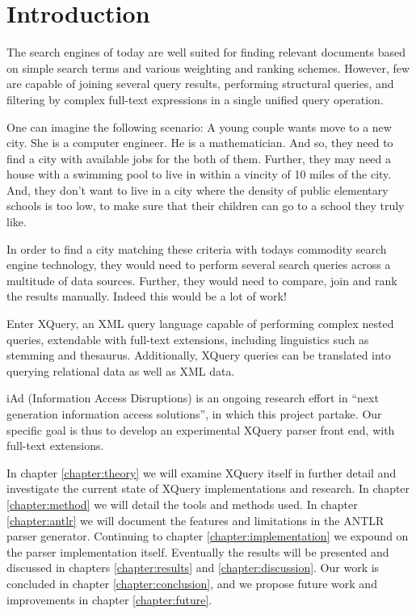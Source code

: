 \chapter{Introduction}
The search engines of today are well suited for finding relevant documents based
on simple search terms and various weighting and ranking schemes. However, few 
are capable of joining several query results, performing structural queries, and
filtering by complex full-text expressions in a single unified query operation.

One can imagine the following scenario: A young couple wants move to a new city.
She is a computer engineer. He is a mathematician. And so, they need to find
a city with available jobs for the both of them. Further, they may need a house
with a swimming pool to live in within a vincity of 10 miles of the city. And,
they don't want to live in a city where the density of public elementary schools
is too low, to make sure that their children can go to a school they truly like.

In order to find a city matching these criteria with todays commodity search
engine technology, they would need to perform several search queries across a
multitude of data sources. Further, they would need to compare, join and
rank the results manually. Indeed this would be a lot of work!

Enter XQuery, an XML query language capable of performing complex nested
queries, extendable with full-text extensions, including linguistics such as
stemming and thesaurus. Additionally, XQuery queries can be translated into
querying relational
data\cite{pathfinder_comptech}\cite{pathfinder_staircase}\cite{galatex}\cite{datadirect} 
as well as XML data.

iAd \cite{iadcentre} (Information Access Disruptions) is an ongoing research
effort in ``next generation information access solutions'', in which this
project partake. Our specific goal is thus to develop an experimental XQuery
parser front end, with full-text extensions.

In chapter \ref{chapter:theory} we will examine XQuery itself in further detail
and investigate the current state of XQuery implementations and research. In
chapter \ref{chapter:method} we will detail the tools and methods used. In
chapter \ref{chapter:antlr} we will document the features and 
limitations in the ANTLR parser generator. Continuing to chapter
\ref{chapter:implementation} we expound on the parser
implementation itself. Eventually the results will be presented and discussed in
chapters \ref{chapter:results} and \ref{chapter:discussion}. Our work is 
concluded in chapter \ref{chapter:conclusion}, and we propose future work and
improvements in chapter \ref{chapter:future}.